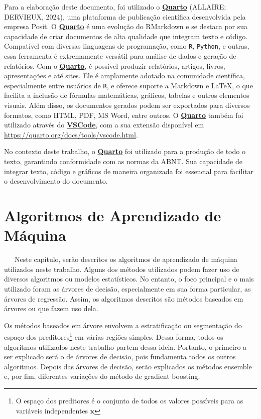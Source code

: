 \documentclass[
  12pt,
  a4paper,
]{scrreprt}
\begin{document}
Para a elaboração deste documento, foi utilizado o
\href{https://quarto.org/}{\textbf{Quarto}} (ALLAIRE; DERVIEUX, 2024),
uma plataforma de publicação científica desenvolvida pela empresa Posit.
O \href{https://quarto.org/}{\textbf{Quarto}} é uma evolução do
RMarkdown e se destaca por sua capacidade de criar documentos de alta
qualidade que integram texto e código. Compatível com diversas
linguagens de programação, como \texttt{R}, \texttt{Python}, e outras,
essa ferramenta é extremamente versátil para análise de dados e geração
de relatórios. Com o \href{https://quarto.org/}{\textbf{Quarto}}, é
possível produzir relatórios, artigos, livros, apresentações e até
sites. Ele é amplamente adotado na comunidade científica, especialmente
entre usuários de \texttt{R}, e oferece suporte a Markdown e \LaTeX, o
que facilita a inclusão de fórmulas matemáticas, gráficos, tabelas e
outros elementos visuais. Além disso, os documentos gerados podem ser
exportados para diversos formatos, como HTML, PDF, MS Word, entre
outros. O \href{https://quarto.org/}{\textbf{Quarto}} também foi
utilizado através do
\href{https://code.visualstudio.com/}{\textbf{VSCode}}, com a sua
extensão disponível em \url{https://quarto.org/docs/tools/vscode.html}.

\vspace{12pt}

No contexto deste trabalho, o
\href{https://quarto.org/}{\textbf{Quarto}} foi utilizado para a
produção de todo o texto, garantindo conformidade com as normas da ABNT.
Sua capacidade de integrar texto, código e gráficos de maneira
organizada foi essencial para facilitar o desenvolvimento do documento.

\chapter{Algoritmos de Aprendizado de
Máquina}\label{algoritmos-de-aprendizado-de-muxe1quina}

~~~Neste capítulo, serão descritos os algoritmos de aprendizado de
máquina utilizados neste trabalho. Alguns dos métodos utilizados podem
fazer uso de diversos algoritmos ou modelos estatísticos. No entanto, o
foco principal e o mais utilizado foram as árvores de decisão,
especialmente em sua forma particular, as árvores de regressão. Assim,
os algoritmos descritos são métodos baseados em árvores ou que fazem uso
dela.

\vspace{12pt}

Os métodos baseados em árvore envolvem a estratificação ou segmentação
do espaço dos preditores\footnote{O espaço dos preditores é o conjunto
  de todos os valores possíveis para as variáveis independentes
  \(\mathbf{x}\)} em várias regiões simples. Dessa forma, todos os
algoritmos utilizados neste trabalho partem dessa ideia. Portanto, o
primeiro a ser explicado será o de árvores de decisão, pois fundamenta
todos os outros algoritmos. Depois das árvores de decisão, serão
explicados os métodos ensemble e, por fim, diferentes variações do
método de gradient boosting.
\end{document}
